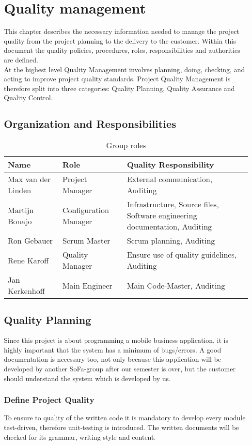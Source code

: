 \section{Quality management}
This chapter describes the necessary information needed to manage the project quality from the project planning to the delivery
to the customer. Within this document the quality policies, procedures, roles, responsibilities and authorities are defined.\\
At the highest level Quality Management involves planning, doing, checking, and acting to improve project quality standards. Project Quality Management is therefore split into three categories: Quality Planning, Quality Assurance and Quality Control.
\subsection{Organization and Responsibilities}
\begin{table}[htbp]
	\begin{tabular}{ p{4cm} p{} p{} }
		\textbf{Name} & \textbf{Role} & \textbf{Quality Responsibility} \\ \hline
		Max van der Linden & Project Manager & External communication, Auditing \\ 
		Martijn Bonajo & Configuration Manager & Infrastructure, Source files, Software engineering documentation, Auditing \\ 
		Ron Gebauer & Scrum Master & Scrum planning, Auditing \\ 
		Rene Karoff & Quality Manager & Ensure use of quality guidelines, Auditing \\ 
		Jan Kerkenhoff & Main Engineer & Main Code-Master, Auditing \\
	\end{tabular}
	\caption{Group roles\label{tab:GroupRoles}}
\end{table}

\subsection{Quality Planning}
Since this project is about programming a mobile business application, it is highly important that the system has a minimum of bugs/errors. A good documentation is necessary too, not only because this application will be developed by another SoFa-group after our semester is over, but the customer should understand the system which is developed by us.
\subsubsection{Define Project Quality}
To ensure to quality of the written code it is mandatory to develop every module test-driven, therefore unit-testing is introduced. The written documents will be checked for its grammar, writing style and content.
